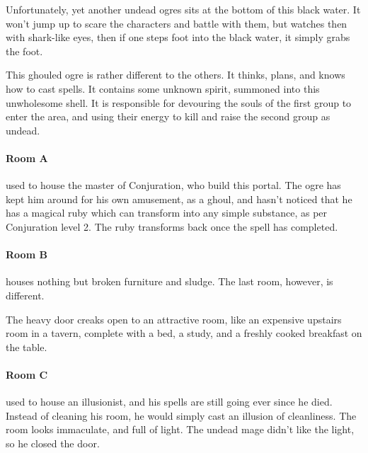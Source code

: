 \begin{multicols}{2}
Unfortunately, yet another undead ogres sits at the bottom of this black water.  It won't jump up to scare the characters and battle with them, but watches then with shark-like eyes, then if one steps foot into the black water, it simply grabs the foot.

This ghouled ogre is rather different to the others.
It thinks, plans, and knows how to cast spells.
It contains some unknown spirit, summoned into this unwholesome shell.
It is responsible for devouring the souls of the first group to enter the area, and using their energy to kill and raise the second group as undead.

\label{undead_ogre}

\paragraph{Room A} used to house the master of Conjuration, who build this portal.  The ogre has kept him around for his own amusement, as a ghoul, and hasn't noticed that he has a magical ruby which can transform into any simple substance, as per Conjuration level 2.  The ruby transforms back once the spell has completed.


\paragraph{Room B} houses nothing but broken furniture and sludge.  The last room, however, is different.

\begin{boxtext}
	The heavy door creaks open to an attractive room, like an expensive upstairs room in a tavern, complete with a bed, a study, and a freshly cooked breakfast on the table.
\end{boxtext}

\paragraph{Room C} used to house an illusionist, and his spells are still going ever since he died.  Instead of cleaning his room, he would simply cast an illusion of cleanliness.  The room looks immaculate, and full of light.  The undead mage didn't like the light, so he closed the door.


\end{multicols}
